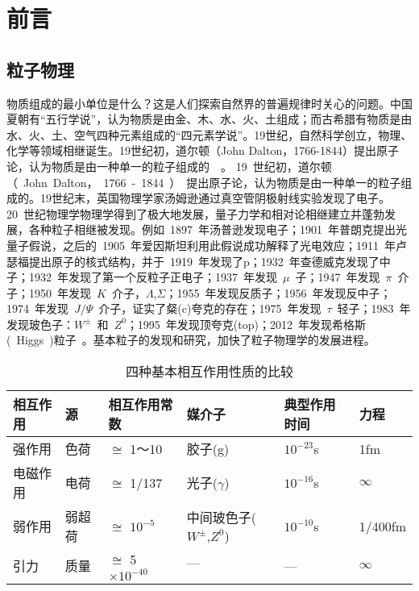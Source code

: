 \chapter{前言}

\section{粒子物理}
物质组成的最小单位是什么？这是人们探索自然界的普遍规律时关心的问题。中国夏朝有“五行学说”，认为物质是由金、木、水、火、土组成；而古希腊有物质是由水、火、土、空气四种元素组成的“四元素学说”。19世纪，自然科学创立，物理、化学等领域相继诞生。19世纪初，道尔顿（John Dalton，1766-1844）提出原子论，认为物质是由一种单一的粒子组成的~\cite{cite1:lv}~。 19~世纪初，道尔顿（~John~Dalton，~1766~-~1844~）~提出原子论，认为物质是由一种单一的粒子组成的。19世纪末，英国物理学家汤姆逊通过真空管阴极射线实验发现了电子。20~世纪物理学物理学得到了极大地发展，量子力学和相对论相继建立并蓬勃发展，各种粒子相继被发现。例如~1897~年汤普逊发现电子；1901~年普朗克提出光量子假说，之后的~1905~年爱因斯坦利用此假说成功解释了光电效应；1911~年卢瑟福提出原子的核式结构，并于~1919~年发现了p；1932~年查德威克发现了中子；1932~年发现了第一个反粒子正电子；1937~年发现~$\mu$~子；1947~年发现~$\pi$~介子；1950~年发现~$K$~介子，$\Lambda$,$\Sigma$；1955~年发现反质子；1956~年发现反中子；1974~年发现~$J/\Psi$~介子，证实了粲(c)夸克的存在；1975~年发现~$\tau$~轻子；1983~年发现玻色子：$W^{\pm}$~和~$Z^{0}$；1995~年发现顶夸克(top)；2012~年发现希格斯(~Higgs~)粒子~\cite{ATLAS:2012}\cite{CMS:2012}。基本粒子的发现和研究，加快了粒子物理学的发展进程。
\begin{table}[!htb]
    \centering
    \caption{\label{tbl:interaction} 四种基本相互作用性质的比较}
    \footnotesize
    \begin{tabular}{llllll}
        \hline
        相互作用& 源&     相互作用常数&                   媒介子&                            典型作用时间&   力程 \\
        \hline
        强作用&   色荷&   $\cong$ 1～10&                 胶子(g)&                           $10^{-23}$s&    1fm \\
        电磁作用& 电荷&   $\cong$ 1/137&                 光子($\gamma$)&                    $10^{-16}$s&    $\infty$\\
        弱作用&   弱超荷& $\cong$ $10^{-5}$&             中间玻色子($W^{\pm}$,$Z^{0}$)&      $10^{-10}$s&   1/400fm \\
        引力&     质量&   $\cong$ 5$\times 10^{-40}$&    $\text{---}$&                      ---&           $\infty$\\
        \hline
    \end{tabular}
\end{table}

